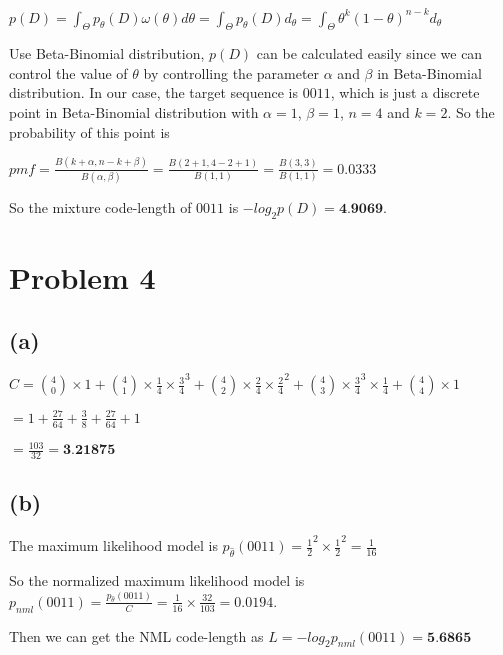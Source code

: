 \documentclass{article}
\begin{document}
\vspace{2mm}

$p(D)=\int_{\Theta}p_{\theta}(D)\omega(\theta)d\theta=\int_{\Theta}p_{\theta}(D)d_{\theta}=\int_{\Theta}\theta^k(1-\theta)^{n-k}d_\theta$

\vspace{2mm}

Use Beta-Binomial distribution, $p(D)$ can be calculated easily since we can control the value of $\theta$ by controlling the parameter $\alpha$ and $\beta$ in Beta-Binomial distribution. In our case, the target sequence is $0011$, which is just a discrete point in Beta-Binomial distribution with $\alpha=1$, $\beta=1$, $n=4$ and $k=2$. So the probability of this point is

\vspace{3mm}

$pmf=\frac{B(k+\alpha, n-k+\beta)}{B(\alpha, \beta)}=\frac{B(2+1,4-2+1)}{B(1,1)}=\frac{B(3,3)}{B(1,1)}=0.0333$

\vspace{3mm}

So the mixture code-length of $0011$ is $-log_2p(D)=\textbf{4.9069}$.

\section{Problem 4}

\subsection*{(a)}

$C={4\choose0}\times1+{4\choose1}\times\frac{1}{4}\times\frac{3}{4}^3+{4\choose2}\times\frac{2}{4}\times\frac{2}{4}^2+{4\choose3}\times\frac{3}{4}^3\times\frac{1}{4}+{4\choose4}\times1$

\vspace{2mm}

$=1+\frac{27}{64}+\frac{3}{8}+\frac{27}{64}+1$

\vspace{2mm}

$=\frac{103}{32}=\textbf{3.21875}$

\subsection*{(b)}

The maximum likelihood model is $p_{\hat{\theta}}(0011)=\frac{1}{2}^2\times\frac{1}{2}^2=\frac{1}{16}$

\vspace{2mm}

So the normalized maximum likelihood model is $p_{nml}(0011)=\frac{p_{\hat{\theta}}(0011)}{C}=\frac{1}{16}\times\frac{32}{103}=0.0194$.

\vspace{2mm}

Then we can get the NML code-length as $L=-log_2 p_{nml}(0011)=\textbf{5.6865}$
\end{document}

